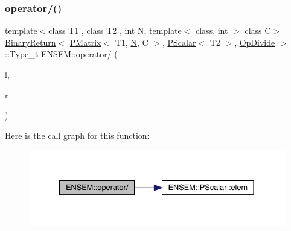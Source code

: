 \subsubsection{\texorpdfstring{operator/()}{operator/()}}
{\footnotesize\ttfamily template$<$class T1 , class T2 , int N, template$<$ class, int $>$ class C$>$ \\
\mbox{\hyperlink{structENSEM_1_1BinaryReturn}{Binary\+Return}}$<$ \mbox{\hyperlink{classENSEM_1_1PMatrix}{P\+Matrix}}$<$ T1, \mbox{\hyperlink{adat__devel_2lib_2hadron_2operator__name__util_8cc_a7722c8ecbb62d99aee7ce68b1752f337}{N}}, C $>$, \mbox{\hyperlink{classENSEM_1_1PScalar}{P\+Scalar}}$<$ T2 $>$, \mbox{\hyperlink{structENSEM_1_1OpDivide}{Op\+Divide}} $>$\+::Type\+\_\+t E\+N\+S\+E\+M\+::operator/ (\begin{DoxyParamCaption}\item[{const \mbox{\hyperlink{classENSEM_1_1PMatrix}{P\+Matrix}}$<$ T1, \mbox{\hyperlink{adat__devel_2lib_2hadron_2operator__name__util_8cc_a7722c8ecbb62d99aee7ce68b1752f337}{N}}, C $>$ \&}]{l,  }\item[{const \mbox{\hyperlink{classENSEM_1_1PScalar}{P\+Scalar}}$<$ T2 $>$ \&}]{r }\end{DoxyParamCaption})\hspace{0.3cm}{\ttfamily [inline]}}

Here is the call graph for this function\+:\nopagebreak
\begin{figure}[H]
\begin{center}
\leavevmode
\includegraphics[width=333pt]{df/d0a/group__primmatrix_ga1b00e76a765453dfbb33f0630bd863c3_cgraph}
\end{center}
\end{figure}
\mbox{\label{group__primmatrix_gafa0f739db2eca6b8b80d632ce81f78b7}} 
